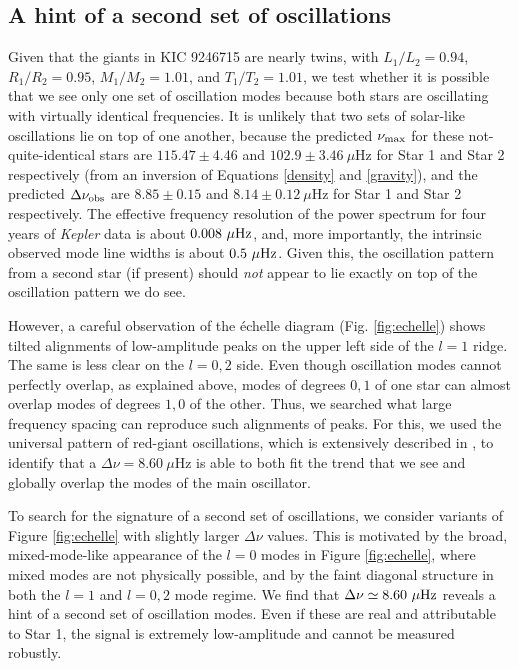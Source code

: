 \subsection{A hint of a second set of oscillations}\label{search}
\label{subsubsec_second_osc}

Given that the giants in KIC 9246715 are nearly twins, with $L_1/L_2 = 0.94$, $R_1/R_2 = 0.95$, $M_1/M_2 = 1.01$, and $T_1/T_2 = 1.01$, we test whether it is possible that we see only one set of oscillation modes because both stars are oscillating with virtually identical frequencies. It is unlikely that two sets of solar-like oscillations lie on top of one another, because the predicted $\nu_{\rm{max}}$ for these not-quite-identical stars are $115.47 \pm 4.46$ and $102.9 \pm 3.46\ \mu$Hz for Star 1 and Star 2 respectively (from an inversion of Equations \ref{density} and \ref{gravity}), and the predicted $\Delta\nu_{\rm{obs}}$ are $8.85 \pm 0.15$ and $8.14 \pm 0.12 \ \mu$Hz for Star 1 and Star 2 respectively. The effective frequency resolution of the power spectrum for four years of \emph{Kepler} data is about $0.008 \ \mu \rm{Hz}$, and, more importantly, the intrinsic observed mode line widths is about $0.5 \ \mu \rm{Hz}$. Given this, the oscillation pattern from a second star (if present) should \emph{not} appear to lie exactly on top of the oscillation pattern we do see.

However, a careful observation of the \'echelle diagram (Fig. \ref{fig:echelle}) shows tilted alignments of low-amplitude peaks on the upper left side of the $l=1$ ridge. The same is less clear on the $l=0,2$ side. Even though oscillation modes cannot perfectly overlap, as explained above, modes of degrees $0,1$ of one star can almost overlap modes of degrees $1,0$ of the other. Thus, we searched what large frequency spacing can reproduce such alignments of peaks. For this, we used the universal pattern of red-giant oscillations, which is extensively described in \citet{mos11}, to identify that a $\Delta\nu = 8.60\ \mu$Hz is able to both fit the trend that we see and globally overlap the modes of the main oscillator.

To search for the signature of a second set of oscillations, we consider variants of Figure \ref{fig:echelle} with slightly larger $\Delta \nu$ values. This is motivated by the broad, mixed-mode-like appearance of the $l=0$ modes in Figure \ref{fig:echelle}, where mixed modes are not physically possible, and by the faint diagonal structure in both the $l=1$ and $l=0,2$ mode regime. We find that $\Delta \nu \simeq 8.60 \ \mu \rm{Hz}$ reveals a hint of a second set of oscillation modes. Even if these are real and attributable to Star 1, the signal is extremely low-amplitude and cannot be measured robustly.

